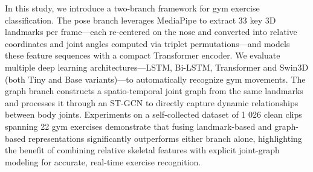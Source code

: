 \documentclass[journal,onecolumn, 11pt]{IEEEtran}
\begin{document}
In this study, we introduce a two-branch framework for gym exercise classification. The pose branch leverages MediaPipe to extract 33 key 3D landmarks per frame—each re-centered on the nose and converted into relative coordinates and joint angles computed via triplet permutations—and models these feature sequences with a compact Transformer encoder. We evaluate multiple deep learning architectures—LSTM, Bi-LSTM, Transformer and Swin3D (both Tiny and Base variants)—to automatically recognize gym movements. The graph branch constructs a spatio-temporal joint graph from the same landmarks and processes it through an ST-GCN to directly capture dynamic relationships between body joints. Experiments on a self-collected dataset of 1 026 clean clips spanning 22 gym exercises demonstrate that fusing landmark-based and graph-based representations significantly outperforms either branch alone, highlighting the benefit of combining relative skeletal features with explicit joint-graph modeling for accurate, real-time exercise recognition.







%
%
\end{document}
